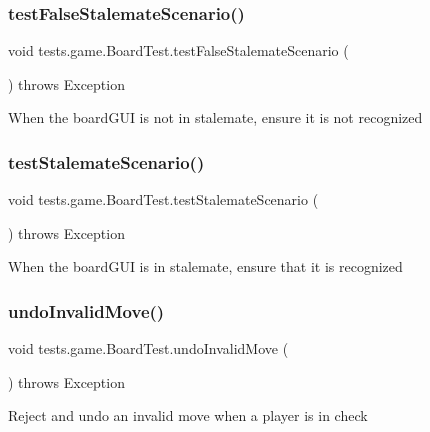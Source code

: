 \subsubsection{\texorpdfstring{test\+False\+Stalemate\+Scenario()}{testFalseStalemateScenario()}}
{\footnotesize\ttfamily void tests.\+game.\+Board\+Test.\+test\+False\+Stalemate\+Scenario (\begin{DoxyParamCaption}{ }\end{DoxyParamCaption}) throws Exception}

When the board\+G\+UI is not in stalemate, ensure it is not recognized \hypertarget{classtests_1_1game_1_1_board_test_a49e4adc799868b9e82bfc217f4d569d8}{}\label{classtests_1_1game_1_1_board_test_a49e4adc799868b9e82bfc217f4d569d8} 
\subsubsection{\texorpdfstring{test\+Stalemate\+Scenario()}{testStalemateScenario()}}
{\footnotesize\ttfamily void tests.\+game.\+Board\+Test.\+test\+Stalemate\+Scenario (\begin{DoxyParamCaption}{ }\end{DoxyParamCaption}) throws Exception}

When the board\+G\+UI is in stalemate, ensure that it is recognized \hypertarget{classtests_1_1game_1_1_board_test_a3c6f4adbcc19328a3897be2e54f49e80}{}\label{classtests_1_1game_1_1_board_test_a3c6f4adbcc19328a3897be2e54f49e80} 
\subsubsection{\texorpdfstring{undo\+Invalid\+Move()}{undoInvalidMove()}}
{\footnotesize\ttfamily void tests.\+game.\+Board\+Test.\+undo\+Invalid\+Move (\begin{DoxyParamCaption}{ }\end{DoxyParamCaption}) throws Exception}

Reject and undo an invalid move when a player is in check \hypertarget{classtests_1_1game_1_1_board_test_a469dc94630f0ed4e98bb43ca330902d3}{}\label{classtests_1_1game_1_1_board_test_a469dc94630f0ed4e98bb43ca330902d3} 
